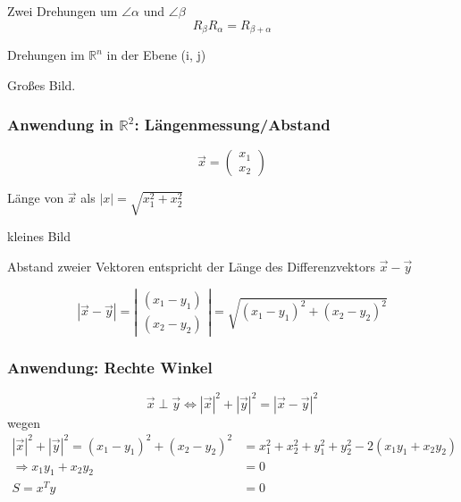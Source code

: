 Zwei Drehungen um $\angle \alpha$ und $\angle \beta$
\begin{equation*}
	R_{\beta} R_{\alpha} = R_{\beta + \alpha}
\end{equation*}

Drehungen im $\mathbb{R}^{n}$ in der Ebene (i, j)

Großes Bild.

\subsubsection*{Anwendung in $\mathbb{R}^{2}$: Längenmessung/Abstand}

\begin{equation*}
	\vec{x} = 
 	\begin{pmatrix}
		x_{1} \\
		x_{2}
 	\end{pmatrix}
\end{equation*}

\begin{definition}
	Länge von $\vec{x}$ als $|x| = \sqrt{x_1^2 + x_2^2}$
\end{definition}

kleines Bild

Abstand zweier Vektoren entspricht der Länge des Differenzvektors $\vec{x} - \vec{y}$

\begin{equation*}
	|\vec{x} - \vec{y}| = \left|
 	\begin{array}{cc}
		(x_1 - y_1)\\
		(x_2 - y_2)
 	\end{array}\right| = 
 	\sqrt{(x_1 - y_1)^2 + (x_2 - y_2)^2}
\end{equation*}

\subsubsection*{Anwendung: Rechte Winkel}

\begin{definition}
\begin{equation*}
	\vec{x} \perp \vec{y} \Leftrightarrow |\vec{x}|^2 + |\vec{y}|^2 = |\vec{x} - \vec{y}|^2
\end{equation*}
wegen
\begin{align*}
	|\vec{x}|^2 + |\vec{y}|^2 = (x_1 - y_1)^2 + (x_2 - y_2)^2 &= x_1^2 + x_2^2 + y_1^2 + y_2^2 - 2(x_1 y_1 + x_2 y_2) \\
	\Rightarrow x_1 y_1 + x_2 y_2 &= 0 \\
	S = x^T y &= 0
\end{align*}
\end{definition}

